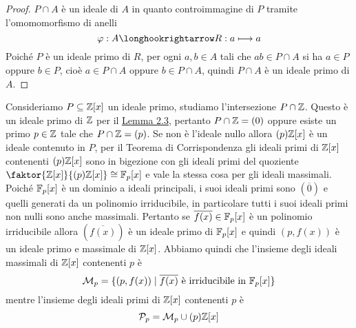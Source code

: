 \documentclass[11pt]{scrartcl}
\begin{document}
\begin{proof}
    $P\cap A$ è un ideale di $A$ in quanto controimmagine di $P$ tramite
    l'omomomorfismo di anelli
    \[
        \varphi: A \longhookrightarrow R: a \longmapsto a
    \]
    Poiché $P$ è un ideale primo di $R$, per ogni $a, b \in A$ tali che 
    $ab \in P\cap A$ si ha $a \in P$
    oppure $b \in P$, cioè $a \in P \cap A$ oppure $b \in P\cap A$, quindi
    $P \cap A$ è un ideale primo di $A$.
\end{proof}


Consideriamo $P \subseteq \mathbb Z[x]$ un ideale primo, studiamo l'intersezione
$P \cap \mathbb Z$. Questo è un ideale primo di $\mathbb Z$ per il 
\hyperref[lemma2.3]{Lemma 2.3}, pertanto $P\cap \mathbb Z = (0)$ oppure esiste un
primo $p \in \mathbb Z$ tale che $P\cap\mathbb Z = (p)$. Se non è l'ideale nullo allora
$(p)\mathbb Z[x]$ è un ideale contenuto in $P$, per il Teorema di 
Corrispondenza gli ideali primi di $\mathbb Z[x]$ contenenti $(p)\mathbb Z[x]$ sono in 
bigezione con gli ideali primi del quoziente $\faktor{\ZZ[x]}{(p)\ZZ[x]} \cong \FF_p[x]$
e vale la stessa cosa per gli ideali massimali. 
Poiché $\mathbb F_p[x]$ è un dominio a ideali principali, i suoi ideali primi 
sono $(\overline{0})$ e quelli generati da un polinomio irriducibile, in particolare
tutti i suoi ideali primi non nulli sono anche massimali. Pertanto se $\overline{f(x)} \in \mathbb F_p[x]$ è un polinomio
irriducibile allora $(\overline{f(x)})$ è un ideale primo di $\mathbb F_p[x]$
e quindi $(p, f(x))$ è un ideale primo e massimale di $\mathbb Z[x]$. Abbiamo quindi che 
l'insieme degli ideali massimali di $\mathbb Z[x]$ contenenti $p$ è
\[
    \mathcal{M}_p = \{(p, f(x))\mid \overline{f(x)}\text{ è irriducibile in }
    \mathbb F_p[x]\}
\]
mentre l'insieme degli ideali primi di $\mathbb Z[x]$ contenenti $p$ è
\[
    \mathcal{P}_p = \mathcal{M}_p \cup (p)\mathbb Z[x]
\]
\end{document}
